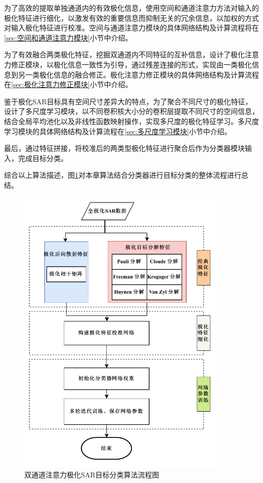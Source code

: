 为了高效的提取单独通道内的有效极化信息，使用空间和通道注意力方法对输入的极化特征进行细化，以激发有效的重要信息而抑制无关的冗余信息，以加权的方式对输入极化特征进行校准。空间与通道注意力模块的具体网络结构及计算流程将在\ref{sec:空间和通道注意力模块}小节中介绍。

为了有效融合两类极化特征，挖掘双通道内不同特征的互补信息，设计了极化注意力修正模块，以极化信息一致性为引导，通过残差连接的形式，实现由一类极化信息到另一类极化信息的融合修正。极化注意力修正模块的具体网络结构及计算流程在\ref{sec:极化注意力修正模块}小节中介绍。

鉴于极化SAR目标具有空间尺寸差异大的特点，为了聚合不同尺寸的极化特征，设计了多尺度学习模块，以不同卷积核大小分的卷积层提取不同尺寸的空间信息，结合全局平均池化以及非线性函数映射操作，实现多尺度的极化特征学习。多尺度学习模块的具体网络结构及计算流程在\ref{sec:多尺度学习模块}小节中介绍。

最后，通过特征拼接，将校准后的两类型极化特征进行聚合后作为分类器模块输入，完成目标分类。

综合以上算法描述，图\ref{流程图}对本章算法结合分类器进行目标分类的整体流程进行总结。
\begin{figure}[ht!]
    \centering
    \includegraphics[width=10cm]{pic/chapter3/DP流程图.pdf}
    \caption{双通道注意力极化SAR目标分类算法流程图}
    \label{流程图}
\end{figure}

